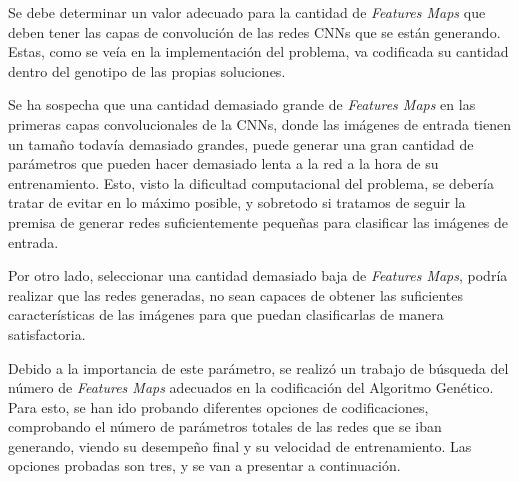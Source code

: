 Se debe determinar un valor adecuado para la cantidad de \textit{Features Maps} que deben tener las capas de convolución de las redes CNNs que se están generando. Estas, como se veía en la implementación del problema, va codificada su cantidad dentro del genotipo de las propias soluciones.

Se ha sospecha que una cantidad demasiado grande de \textit{Features Maps} en las primeras capas convolucionales de la CNNs, donde las imágenes de entrada tienen un tamaño todavía demasiado grandes, puede generar una gran cantidad de parámetros que pueden hacer demasiado lenta a la red a la hora de su entrenamiento. Esto, visto la dificultad computacional del problema, se debería tratar de evitar en lo máximo posible, y sobretodo si tratamos de seguir la premisa de generar redes suficientemente pequeñas para clasificar las imágenes de entrada.

Por otro lado, seleccionar una cantidad demasiado baja de \textit{Features Maps}, podría realizar que las redes generadas, no sean capaces de obtener las suficientes características de las imágenes para que puedan clasificarlas de manera satisfactoria.

Debido a la importancia de este parámetro, se realizó un trabajo de búsqueda del número de \textit{Features Maps} adecuados en la codificación del Algoritmo Genético. Para esto, se han ido probando diferentes opciones de codificaciones, comprobando el número de parámetros totales de las redes que se iban generando, viendo su desempeño final y su velocidad de entrenamiento. Las opciones probadas son tres, y se van a presentar a continuación.

